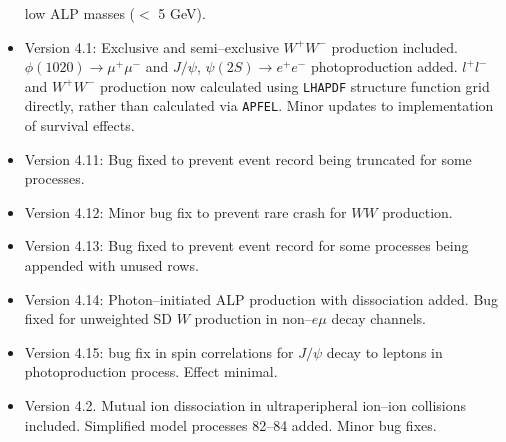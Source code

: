 \documentclass[12pt]{article}
\begin{document}
\begin{itemize}
low ALP masses ($<$ 5 GeV).
\item Version 4.1: Exclusive and semi--exclusive $W^+ W^-$ production included.  $\phi(1020)\to \mu^+ \mu^-$ and $J/\psi$, $\psi(2S) \to e^+ e^-$ 
photoproduction added. $l^+ l^-$ and $W^+ W^-$ production now calculated using \texttt{LHAPDF} structure function grid directly, rather than calculated 
via \texttt{APFEL}. Minor updates to implementation of survival effects.
\item Version 4.11: Bug fixed to prevent event record being truncated for some processes.
\item Version 4.12: Minor bug fix to prevent rare crash for $WW$ production.
\item Version 4.13: Bug fixed to prevent event record for some processes being appended with unused rows.
\item Version 4.14: Photon--initiated ALP production with dissociation added. Bug fixed for unweighted SD $W$ production in non--$e\mu$ decay channels.
\item Version 4.15: bug fix in spin correlations for $J/\psi$ decay to leptons in photoproduction process. Effect minimal.
\item Version 4.2. Mutual ion dissociation in ultraperipheral ion--ion collisions included. Simplified model processes 82--84 added. Minor bug fixes.

\end{itemize}


%
{}

\end{document}
